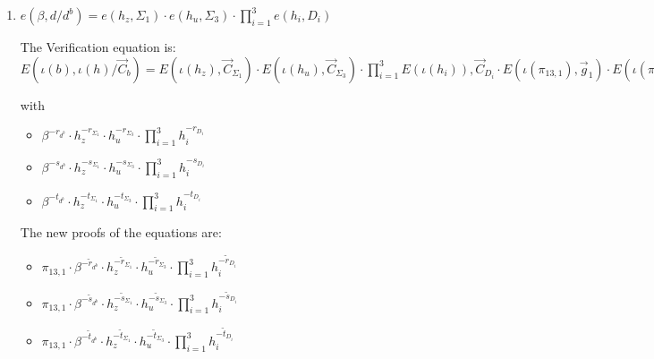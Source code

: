 \begin{description}
\begin{enumerate}
    The new proofs of the equations are:
    \begin{itemize}
    \item[$\tilde{\pi}_{12,1} = $] $\pi_{12,1} \cdot \alpha^{-\tilde{r}_{d^b}} \cdot g_z^{-\tilde{r}_{\Sigma_1}} \cdot g_r^{-\tilde{r}_{\Sigma_2}} \cdot \prod_{i=1}^3 g_i^{-\tilde{r}_{D_i}}$
    \item[$\tilde{\pi}_{12,2} = $] $\pi_{12,2} \cdot \alpha^{-\tilde{s}_{d^b}} \cdot g_z^{-\tilde{s}_{\Sigma_1}} \cdot g_r^{-\tilde{s}_{\Sigma_2}} \cdot \prod_{i=1}^3 g_i^{-\tilde{s}_{D_i}}$
    \item[$\tilde{\pi}_{12,3} = $] $\pi_{12,3} \cdot \alpha^{-\tilde{t}_{d^b}} \cdot g_z^{-\tilde{t}_{\Sigma_1}} \cdot g_r^{-\tilde{t}_{\Sigma_2}} \cdot \prod_{i=1}^3 g_i^{-\tilde{t}_{D_i}}$
    \end{itemize}

  \item $e(\beta, d/\boxed{d^b}) = e(h_z, \boxed{\Sigma_1}) \cdot e(h_u, \boxed{\Sigma_3}) \cdot \prod_{i=1}^3 e(h_i, \boxed{D_i})$

    The Verification equation is: $E(\iota(b), \iota(h)/\vec{C}_{b}) = E(\iota(h_z), \vec{C}_{\Sigma_1}) \cdot E(\iota(h_u), \vec{C}_{\Sigma_3}) \cdot \prod_{i=1}^3 E(\iota(h_i)), \vec{C}_{D_i} \cdot E(\iota(\pi_{13,1}), \vec{g}_1)\cdot E(\iota(\pi_{13,2}), \vec{g}_2)\cdot E(\iota(\pi_{13,3}), \vec{g}_3)$

    with
    \begin{itemize}
    \item[$\pi_{13,1} = $] $\beta^{-r_{d^b}} \cdot h_z^{-r_{\Sigma_1}} \cdot h_u^{-r_{\Sigma_3}} \cdot \prod_{i=1}^3 h_i^{-r_{D_i}}$
    \item[$\pi_{13,2} = $] $\beta^{-s_{d^b}} \cdot h_z^{-s_{\Sigma_1}} \cdot h_u^{-s_{\Sigma_3}} \cdot \prod_{i=1}^3 h_i^{-s_{D_i}}$
    \item[$\pi_{13,3} = $] $\beta^{-t_{d^b}} \cdot h_z^{-t_{\Sigma_1}} \cdot h_u^{-t_{\Sigma_3}} \cdot \prod_{i=1}^3 h_i^{-t_{D_i}}$
    \end{itemize}

    The new proofs of the equations are:
    \begin{itemize}
    \item[$\tilde{\pi}_{13,1} = $] $\pi_{13,1} \cdot \beta^{-\tilde{r}_{d^b}} \cdot h_z^{-\tilde{r}_{\Sigma_1}} \cdot h_u^{-\tilde{r}_{\Sigma_3}} \cdot \prod_{i=1}^3 h_i^{-\tilde{r}_{D_i}}$
    \item[$\tilde{\pi}_{13,2} = $] $\pi_{13,1} \cdot \beta^{-\tilde{s}_{d^b}} \cdot h_z^{-\tilde{s}_{\Sigma_1}} \cdot h_u^{-\tilde{s}_{\Sigma_3}} \cdot \prod_{i=1}^3 h_i^{-\tilde{s}_{D_i}}$
    \item[$\tilde{\pi}_{13,3} = $] $\pi_{13,1} \cdot \beta^{-\tilde{t}_{d^b}} \cdot h_z^{-\tilde{t}_{\Sigma_1}} \cdot h_u^{-\tilde{t}_{\Sigma_3}} \cdot \prod_{i=1}^3 h_i^{-\tilde{t}_{D_i}}$
    \end{itemize}


\end{enumerate}
\end{description}
